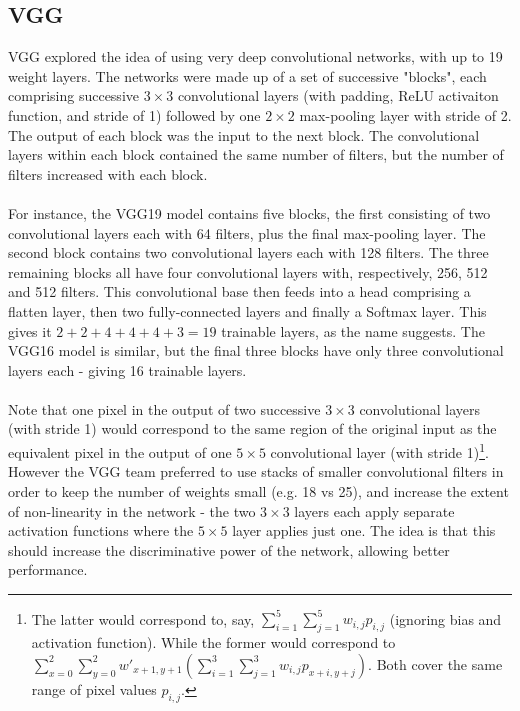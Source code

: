 \documentclass[11pt]{article} %
\theoremstyle{plain}
\theoremstyle{definition}
\begin{document}
\subsection{VGG}
VGG \cite{VGG_Paper} explored the idea of using very deep convolutional networks, with up to 19 weight layers. The networks were made up of a set of successive "blocks", each comprising successive \(3 \times 3\)  convolutional layers (with padding, ReLU activaiton function, and stride of 1) followed by one \(2 \times 2\) max-pooling layer with stride of 2. The output of each block was the input to the next block. The convolutional layers within each block contained the same number of filters, but the number of filters increased with each block. 
\\
\\
\noindent
For instance, the VGG19 model contains five blocks, the first consisting of two convolutional layers each with 64 filters, plus the final max-pooling layer. The second block contains two convolutional layers each with 128 filters. The three remaining blocks all have four convolutional layers with, respectively, 256, 512 and 512 filters. This convolutional base then feeds into a head comprising a flatten layer, then two fully-connected layers and finally a Softmax layer. This gives it \(2 + 2 + 4 + 4 + 4 + 3 = 19\) trainable layers, as the name suggests. The VGG16 model is similar, but the final three blocks have only three convolutional layers each - giving 16 trainable layers. 
\\
\\
\noindent
Note that one pixel in the output of two successive \(3 \times 3\) convolutional layers (with stride 1) would correspond to the same region of the original input as the equivalent pixel in the output of one \(5 \times 5\) convolutional layer (with stride 1)\footnote{The latter would correspond to, say, \( \sum_{i=1}^5 \sum_{j=1}^5 w_{i,j}p_{i,j} \) (ignoring bias and activation function). While the former would correspond to \( \sum_{x=0}^2 \sum_{y=0}^2 w'_{x+1,y+1}(\sum_{i=1}^3 \sum_{j=1}^3 w_{i,j}p_{x+i,y+j}) \). Both cover the same range of pixel values \(p_{i,j}\).}. However the VGG team preferred to use stacks of smaller convolutional filters in order to keep the number of weights small (e.g. 18 vs 25), and increase the extent of non-linearity in the network - the two \(3 \times 3\) layers each apply separate activation functions where the \(5 \times 5\) layer applies just one. The idea is that this should increase the discriminative power of the network, allowing better performance.
\end{document}
